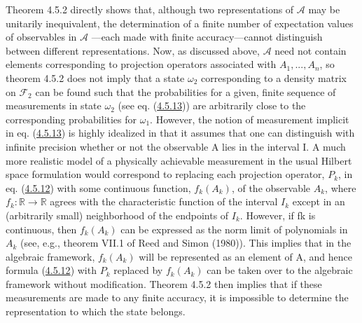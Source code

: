 \documentclass[11pt,a4paper]{article}
\begin{document}
Theorem 4.5.2 directly shows that, although two representations of \(\mathcal{A}\) may be unitarily inequivalent, the determination of a finite number of expectation values of observables in \(\mathcal{A}\) ---each made with finite accuracy---cannot distinguish between different representations. Now, as discussed above, \(\mathcal{A}\) need not contain elements corresponding to projection operators associated with \(A_1,...,A_n\), so theorem 4.5.2 does not imply that a state \(\omega_2\) corresponding to a \hypertarget{source-95}{} density matrix on \(\mathcal F_2\) can be found such that the probabilities for a given, finite sequence of measurements in state \(\omega_2\) (see eq. (\hyperref[eq:4.5.13]{4.5.13})) are arbitrarily close to the corresponding probabilities for \(\omega_1\). However, the notion of measurement implicit in eq. (\hyperref[eq:4.5.13]{4.5.13}) is highly idealized in that it assumes that one can distinguish with infinite precision whether or not the observable A lies in the interval I. A much more realistic model of a physically achievable measurement in the usual Hilbert space formulation would correspond to replacing each projection operator, \(P_k\), in eq. (\hyperref[eq:4.5.12]{4.5.12}) with some continuous function, \(f_k(A_k)\), of the observable \(A_k\), where \(f_k: \mathbb{R} \to \mathbb{R}\) agrees with the characteristic function of the interval \(I_k\) except in an (arbitrarily small) neighborhood of the endpoints of \(I_k\). However, if fk is continuous, then \(f_k(A_k)\) can be expressed as the norm limit of polynomials in \(A_k\) (see, e.g., theorem VII.1 of Reed and Simon (1980)). This implies that in the algebraic framework, \(f_k(A_k)\) will be represented as an element of A, and hence formula (\hyperref[eq:4.5.12]{4.5.12}) with \(P_k\) replaced by \(f_k(A_k)\) can be taken over to the algebraic framework without modification. Theorem 4.5.2 then implies that if these measurements are made to any finite accuracy, it is impossible to determine the representation to which the state belongs.
\end{document}
